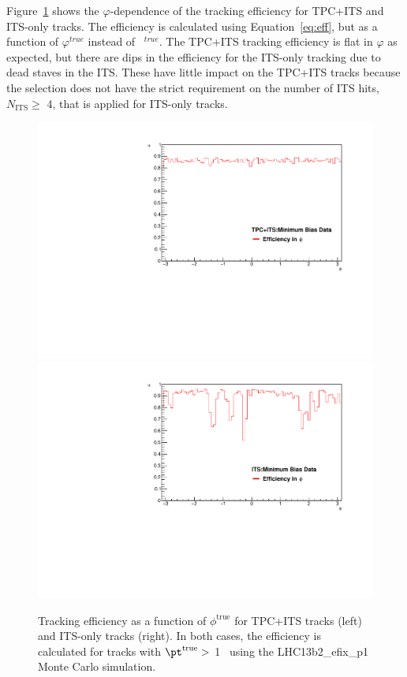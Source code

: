 Figure~\ref{fig:phiEff} shows the $\varphi$-dependence of the tracking efficiency for TPC+ITS and ITS-only tracks. The efficiency is calculated using Equation~\ref{eq:eff}, but as a function of $\varphi^{true}$ instead of \pt~$^{true}$. The TPC+ITS tracking efficiency is flat in $\varphi$ as expected, but there are dips in the efficiency for the ITS-only tracking due to dead staves in the ITS. These have little impact on the TPC+ITS tracks because the selection does not have the strict requirement on the number of ITS hits, $N_{\mathrm{ITS}} \geq$ 4, that is applied for ITS-only tracks. 

\begin{figure}[h]
\center
\includegraphics[width=.495\textwidth]{Data_Analysis/Tracking/tpc_phi_eff.pdf}
\includegraphics[width=.495\textwidth]{Data_Analysis/Tracking/its_phi_eff.pdf}
\caption{Tracking efficiency as a function of $\phi^{\mathrm{true}}$ for TPC+ITS tracks (left) and ITS-only tracks (right). In both cases, the efficiency is calculated for tracks with $\pt^{\mathrm{true}}>$ 1 \GeVc~using the LHC13b2\_efix\_p1 Monte Carlo simulation.}
\label{fig:phiEff}
\end{figure}

